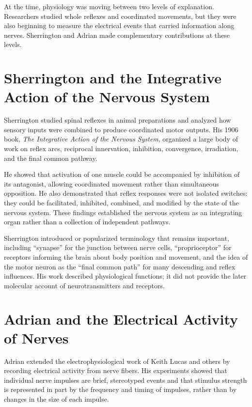 At the time, physiology was moving between two levels of explanation. Researchers studied whole reflexes and coordinated movements, but they were also beginning to measure the electrical events that carried information along nerves. Sherrington and Adrian made complementary contributions at these levels.

\section{Sherrington and the Integrative Action of the Nervous System}

Sherrington studied spinal reflexes in animal preparations and analyzed how sensory inputs were combined to produce coordinated motor outputs. His 1906 book, \emph{The Integrative Action of the Nervous System}, organized a large body of work on reflex arcs, reciprocal innervation, inhibition, convergence, irradiation, and the final common pathway.

He showed that activation of one muscle could be accompanied by inhibition of its antagonist, allowing coordinated movement rather than simultaneous opposition. He also demonstrated that reflex responses were not isolated switches: they could be facilitated, inhibited, combined, and modified by the state of the nervous system. These findings established the nervous system as an integrating organ rather than a collection of independent pathways.

Sherrington introduced or popularized terminology that remains important, including ``synapse'' for the junction between nerve cells, ``proprioceptor'' for receptors informing the brain about body position and movement, and the idea of the motor neuron as the ``final common path'' for many descending and reflex influences. His work described physiological functions; it did not provide the later molecular account of neurotransmitters and receptors.

\section{Adrian and the Electrical Activity of Nerves}

Adrian extended the electrophysiological work of Keith Lucas and others by recording electrical activity from nerve fibers. His experiments showed that individual nerve impulses are brief, stereotyped events and that stimulus strength is represented in part by the frequency and timing of impulses, rather than by changes in the size of each impulse.

